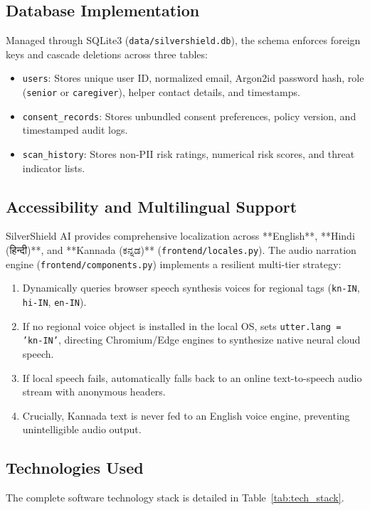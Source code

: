 \documentclass[conference]{IEEEtran}
\begin{document}
\subsection{Database Implementation}
Managed through SQLite3 (\texttt{data/silvershield.db}), the schema enforces foreign keys and cascade deletions across three tables:
\begin{itemize}
    \item \texttt{users}: Stores unique user ID, normalized email, Argon2id password hash, role (\texttt{senior} or \texttt{caregiver}), helper contact details, and timestamps.
    \item \texttt{consent\_records}: Stores unbundled consent preferences, policy version, and timestamped audit logs.
    \item \texttt{scan\_history}: Stores non-PII risk ratings, numerical risk scores, and threat indicator lists.
\end{itemize}

\subsection{Accessibility and Multilingual Support}
SilverShield AI provides comprehensive localization across **English**, **Hindi (हिन्दी)**, and **Kannada (ಕನ್ನಡ)** (\texttt{frontend/locales.py}).
The audio narration engine (\texttt{frontend/components.py}) implements a resilient multi-tier strategy:
\begin{enumerate}
    \item Dynamically queries browser speech synthesis voices for regional tags (\texttt{kn-IN}, \texttt{hi-IN}, \texttt{en-IN}).
    \item If no regional voice object is installed in the local OS, sets \texttt{utter.lang = 'kn-IN'}, directing Chromium/Edge engines to synthesize native neural cloud speech.
    \item If local speech fails, automatically falls back to an online text-to-speech audio stream with anonymous headers.
    \item Crucially, Kannada text is never fed to an English voice engine, preventing unintelligible audio output.
\end{enumerate}

\subsection{Technologies Used}
The complete software technology stack is detailed in Table~\ref{tab:tech_stack}.
\end{document}
